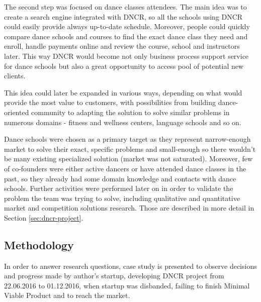 \documentclass{article}
\begin{document}
The second step was focused on dance classes attendees. The main idea was to create a search engine integrated with DNCR, so all the schools using DNCR could easily provide always up-to-date schedule. Moreover, people could quickly compare dance schools and courses to find the exact dance class they need and enroll, handle payments online and review the course, school and instructors later. This way DNCR would become not only business process support service for dance schools but also a great opportunity to access pool of potential new clients.

This idea could later be expanded in various ways, depending on what would provide the most value to customers, with possibilities from building dance-oriented community to adapting the solution to solve similar problems in numerous domains - fitness and wellness centers, language schools and so on.

Dance schools were chosen as a primary target as they represent narrow-enough market to solve their exact, specific problems and small-enough so there wouldn't be many existing specialized solution (market was not saturated). Moreover, few of co-founders were either active dancers or have attended dance classes in the past, so they already had some domain knowledge and contacts with dance schools. Further activities were performed later on in order to validate the problem the team was trying to solve, including qualitative and quantitative market and competition solutions research. Those are described in more detail in Section \ref{sec:dncr-project}.

\subsection{Methodology}
In order to answer research questions, case study is presented to observe decisions and progress made by author's startup, developing DNCR project from 22.06.2016 to 01.12.2016, when startup was disbanded, failing to finish Minimal Viable Product and to reach the market.
\end{document}
